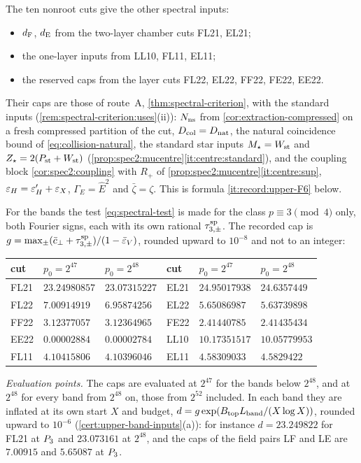 The ten nonroot cuts give the other spectral inputs:
\begin{itemize}
\item $d_{\rm F}$, $d_{\rm E}$ from the two-layer chamber cuts FL21, EL21;
\item the one-layer inputs from LL10, FL11, EL11;
\item the reserved caps from the layer cuts FL22, EL22, FF22, FE22, EE22.
\end{itemize}
Their caps are those of route~A, \cref{thm:spectral-criterion}, with the standard
inputs (\cref{rem:spectral-criterion:uses}(ii)): $N_{\rm ns}$ from
\cref{cor:extraction-compressed} on a fresh compressed partition of the cut,
$D_{\rm col}=D_{\rm nat}$, the natural coincidence bound of
\eqref{eq:collision-natural}, the standard star inputs $M_\star=W_{\rm st}$ and
$Z_\star=2(P_{\rm st}+W_{\rm st})$ (\cref{prop:spec2:mucentre}\ref{it:centre:standard}),
and the coupling block \cref{cor:spec2:coupling} with $R_+$ of
\cref{prop:spec2:mucentre}\ref{it:centre:sup}, $\varepsilon_H=\varepsilon'_H+\varepsilon_X$,
$\Gamma_E=\hat E^2$ and $\bar\zeta=\zeta$. This is formula \ref{it:record:upper-F6}
below.

For the bands the test \eqref{eq:spectral-test} is made for the class
$p\equiv3\pmod4$ only, both Fourier signs, each with its own rational
$\tau^{\rm sp}_{3,\pm}$. The recorded cap is
$g=\max_\pm(\bar c_{\perp}+\tau^{\rm sp}_{3,\pm})/(1-\bar{\varepsilon}_V)$, rounded upward to
$10^{-8}$ and not to an integer:
\begin{center}
\small
\begin{tabular}{@{}lll@{\qquad}lll@{}}
\toprule
cut & $p_0=2^{47}$ & $p_0=2^{48}$ & cut & $p_0=2^{47}$ & $p_0=2^{48}$\\
\midrule
FL21 & $23.24980857$ & $23.07315227$ & EL21 & $24.95017938$ & $24.6357449$\\
FL22 & $7.00914919$ & $6.95874256$ & EL22 & $5.65086987$ & $5.63739898$\\
FF22 & $3.12377057$ & $3.12364965$ & FE22 & $2.41440785$ & $2.41435434$\\
EE22 & $0.00002884$ & $0.00002784$ & LL10 & $10.17351517$ & $10.05779953$\\
FL11 & $4.10415806$ & $4.10396046$ & EL11 & $4.58309033$ & $4.5829422$\\
\bottomrule
\end{tabular}
\end{center}

\emph{Evaluation points.} The caps are evaluated at $2^{47}$ for the bands below
$2^{48}$, and at $2^{48}$ for every band from $2^{48}$ on, those from $2^{52}$
included. In each band they are inflated at its own start $X$ and budget,
$d=g\exp(B_{\rm top}L_{\rm band}/(X\log X))$, rounded upward to $10^{-6}$
(\cref{cert:upper-band-inputs}(a)): for instance $d=23.249822$ for FL21 at
$P_3$ and $23.073161$ at $2^{48}$, and the caps of the field pairs LF and LE
are $7.00915$ and $5.65087$ at $P_3$.


